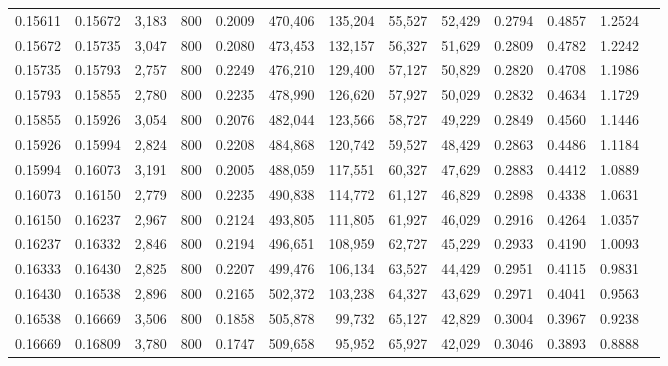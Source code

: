 \begin{tabular}{rrrrrrrrrrrrr}
0.15611 & 0.15672 &  3,183 &   800 &                                     0.2009 & 470,406 & 135,204 &  55,527 &  52,429 & 0.2794 & 0.4857 & 1.2524 \\
0.15672 & 0.15735 &  3,047 &   800 &                                     0.2080 & 473,453 & 132,157 &  56,327 &  51,629 & 0.2809 & 0.4782 & 1.2242 \\
0.15735 & 0.15793 &  2,757 &   800 &                                     0.2249 & 476,210 & 129,400 &  57,127 &  50,829 & 0.2820 & 0.4708 & 1.1986 \\
0.15793 & 0.15855 &  2,780 &   800 &                                     0.2235 & 478,990 & 126,620 &  57,927 &  50,029 & 0.2832 & 0.4634 & 1.1729 \\
0.15855 & 0.15926 &  3,054 &   800 &                                     0.2076 & 482,044 & 123,566 &  58,727 &  49,229 & 0.2849 & 0.4560 & 1.1446 \\
0.15926 & 0.15994 &  2,824 &   800 &                                     0.2208 & 484,868 & 120,742 &  59,527 &  48,429 & 0.2863 & 0.4486 & 1.1184 \\
0.15994 & 0.16073 &  3,191 &   800 &                                     0.2005 & 488,059 & 117,551 &  60,327 &  47,629 & 0.2883 & 0.4412 & 1.0889 \\
0.16073 & 0.16150 &  2,779 &   800 &                                     0.2235 & 490,838 & 114,772 &  61,127 &  46,829 & 0.2898 & 0.4338 & 1.0631 \\
0.16150 & 0.16237 &  2,967 &   800 &                                     0.2124 & 493,805 & 111,805 &  61,927 &  46,029 & 0.2916 & 0.4264 & 1.0357 \\
0.16237 & 0.16332 &  2,846 &   800 &                                     0.2194 & 496,651 & 108,959 &  62,727 &  45,229 & 0.2933 & 0.4190 & 1.0093 \\
0.16333 & 0.16430 &  2,825 &   800 &                                     0.2207 & 499,476 & 106,134 &  63,527 &  44,429 & 0.2951 & 0.4115 & 0.9831 \\
0.16430 & 0.16538 &  2,896 &   800 &                                     0.2165 & 502,372 & 103,238 &  64,327 &  43,629 & 0.2971 & 0.4041 & 0.9563 \\
0.16538 & 0.16669 &  3,506 &   800 &                                     0.1858 & 505,878 &  99,732 &  65,127 &  42,829 & 0.3004 & 0.3967 & 0.9238 \\
0.16669 & 0.16809 &  3,780 &   800 &                                     0.1747 & 509,658 &  95,952 &  65,927 &  42,029 & 0.3046 & 0.3893 & 0.8888 \\

\end{tabular}
